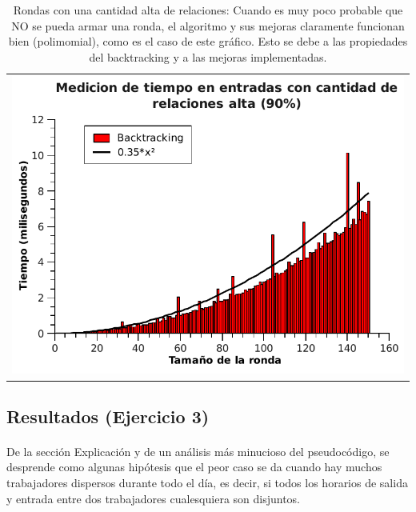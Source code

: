 \begin{table}[h!] %
\centering %
\begin{tabular}{c}
\includegraphics[scale=0.7]{../Ej_2/Otros/Graficos/Graph90.pdf} \\
\end{tabular}

\caption{Rondas con una cantidad alta de relaciones: Cuando es muy poco probable que NO se pueda armar una ronda, el algoritmo y sus mejoras claramente funcionan bien (polimomial), como es el caso de este gráfico. Esto se debe a las propiedades del backtracking y a las mejoras implementadas.} %
\label{tiempoEj2c} %
\end{table}


\pagebreak[4]
\clearpage

\subsection{Resultados (Ejercicio 3)}
\label{resultadosej3}

\paragraph{}
De la sección Explicación y de un análisis más minucioso del pseudocódigo, se desprende como algunas hipótesis
 que el peor caso se da cuando hay muchos trabajadores dispersos durante todo el día, es decir, si todos los horarios de salida y entrada entre dos trabajadores cualesquiera son disjuntos.

